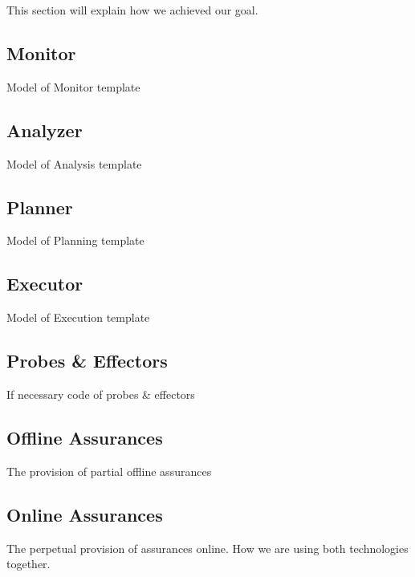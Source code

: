 This section will explain how we achieved our goal.
\subsection{Monitor}

Model of Monitor template

\subsection{Analyzer}
Model of Analysis template

\subsection{Planner}
Model of Planning template

\subsection{Executor}
Model of Execution template

\subsection{Probes \& Effectors}
If necessary code of probes \& effectors

\subsection{Offline Assurances}
The provision of partial offline assurances

\subsection{Online Assurances}
The perpetual provision of assurances online. How we are using both technologies together.